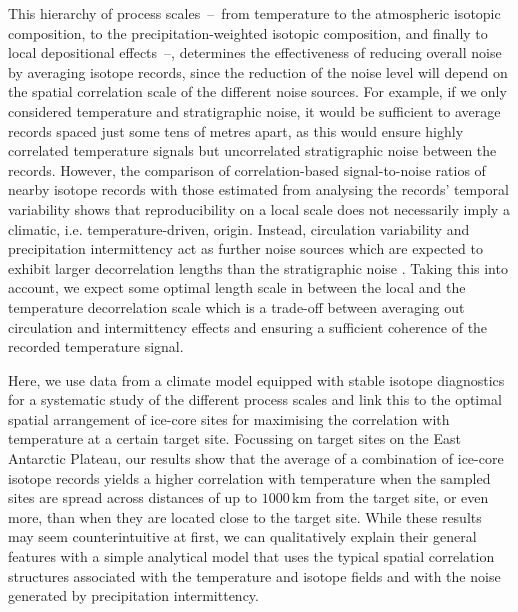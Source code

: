 \documentclass[cp, manuscript]{copernicus}
\begin{document}
This hierarchy of process scales~--~from temperature to the atmospheric isotopic
composition, to the precipitation-weighted isotopic composition, and finally to
local depositional effects~--, determines the effectiveness of reducing overall
noise by averaging isotope records, since the reduction of the noise level will
depend on the spatial correlation scale of the different noise sources. For
example, if we only considered temperature and stratigraphic noise, it would be
sufficient to average records spaced just some tens of metres apart, as this
would ensure highly correlated temperature signals but uncorrelated
stratigraphic noise between the records. However, the comparison of
correlation-based signal-to-noise ratios of nearby isotope records
\citep{Munch2016,Munch2017} with those estimated from analysing the records'
temporal variability \citep{Laepple2018} shows that reproducibility on a local
scale does not necessarily imply a climatic, i.e. temperature-driven,
origin. Instead, circulation variability and precipitation intermittency act as
further noise sources which are expected to exhibit larger decorrelation lengths
than the stratigraphic noise \citep{Laepple2018,Munch2018a}. Taking this into
account, we expect some optimal length scale in between the local and the
temperature decorrelation scale which is a trade-off between averaging out
circulation and intermittency effects and ensuring a sufficient coherence of the
recorded temperature signal.

Here, we use data from a climate model equipped with stable isotope diagnostics
for a systematic study of the different process scales and link this to the
optimal spatial arrangement of ice-core sites for maximising the correlation
with temperature at a certain target site. Focussing on target sites on the East
Antarctic Plateau, our results show that the average of a combination of
ice-core isotope records yields a higher correlation with temperature when the
sampled sites are spread across distances of up to $1000$\,km from the target
site, or even more, than when they are located close to the target site. While
these results may seem counterintuitive at first, we can qualitatively explain
their general features with a simple analytical model that uses the typical
spatial correlation structures associated with the temperature and isotope
fields and with the noise generated by precipitation intermittency.
\end{document}
